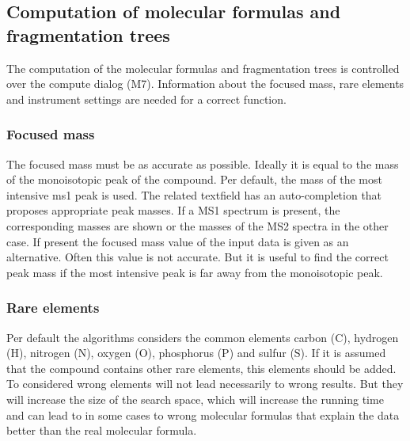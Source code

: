 \documentclass[a4paper,11pt]{article}
\begin{document}
 \subsection{Computation of molecular formulas and fragmentation trees}
 
 The computation of the molecular formulas and fragmentation trees is controlled over the compute dialog (M7). 
 Information about the focused mass, rare elements and instrument settings are needed for a correct function.
 
 \subsubsection{Focused mass}
 
 The focused mass must be as accurate as possible. Ideally it is equal to the mass of the monoisotopic peak of the compound. Per default, 
 the mass of the most intensive ms1 peak is used. The related textfield has an auto-completion that proposes appropriate peak masses. 
 If a MS1 spectrum is present, the corresponding masses are shown or the masses of the MS2 spectra in the other case.  
 If present the focused mass value of the input data is given as an alternative.  Often this value is not accurate. 
 But it is useful to find the correct peak mass if the most intensive peak is far away from the monoisotopic peak.
 
 \subsubsection{Rare elements}
 
 Per default the algorithms considers the common elements carbon (C), hydrogen (H), nitrogen (N), oxygen (O), phosphorus (P) and sulfur (S). 
 If it is assumed that the compound contains other rare elements, this elements should be added. To considered wrong elements will not lead necessarily 
 to wrong results. But they will increase the size of the search space, which will increase the running time and can lead to in some cases 
 to wrong molecular formulas that explain the data better than the real molecular formula.
 
\end{document}

